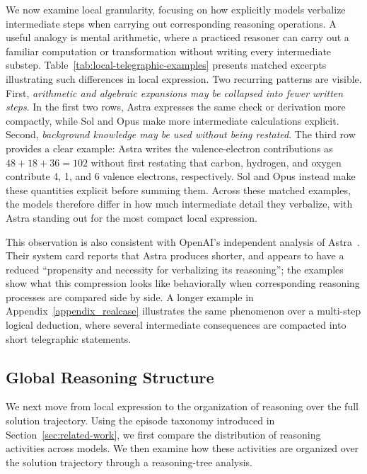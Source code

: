 \documentclass[10pt,letterpaper]{article}
\begin{document}

We now examine local granularity, focusing on how explicitly models verbalize
intermediate steps when carrying out corresponding reasoning operations.
A useful analogy is mental arithmetic, where a practiced reasoner can carry out
a familiar computation or transformation without writing every intermediate
substep.
Table~\ref{tab:local-telegraphic-examples} presents matched excerpts illustrating
such differences in local expression.
Two recurring patterns are visible.
First, \emph{arithmetic and algebraic expansions may be collapsed into fewer written steps}. In the first two rows, Astra expresses the same check or derivation more
compactly, while Sol and Opus make more intermediate calculations explicit. Second, \emph{background knowledge may be used without being restated}. The third row provides a clear example: Astra writes the
valence-electron contributions as \(48+18+36=102\) without first restating that carbon, hydrogen, and oxygen contribute 4, 1, and 6 valence electrons,
respectively. Sol and Opus instead make these quantities explicit before summing them. Across these matched examples, the models therefore differ in how much intermediate detail they verbalize, with Astra standing out for the most compact local expression.

This observation is also consistent with OpenAI’s independent analysis of Astra~\citep{openai2026astra}. Their system card reports that Astra produces shorter, and appears to have a reduced “propensity and necessity for verbalizing its reasoning”; the examples show what this compression looks like behaviorally when corresponding reasoning processes are compared side by side. A longer example in Appendix~\ref{appendix_realcase} illustrates the same phenomenon over a multi-step logical deduction, where several intermediate consequences are compacted into short telegraphic statements.


\subsection{Global Reasoning Structure}
\label{sec}

We next move from local expression to the organization of reasoning over the full solution trajectory.
Using the episode taxonomy introduced in Section~\ref{sec:related-work}, we first compare the distribution
of reasoning activities across models.
We then examine how these activities are organized over the solution trajectory
through a reasoning-tree analysis.
\end{document}
